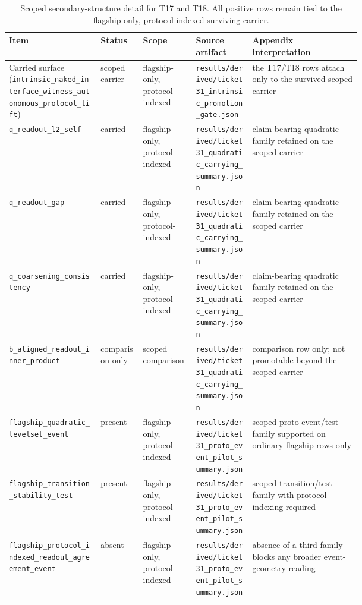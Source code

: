 \documentclass[11pt]{article}
\theoremstyle{definition}
\begin{document}
\begin{table}[p]
\centering
\scriptsize
\caption{Scoped secondary-structure detail for T17 and T18. All positive rows remain tied to
the flagship-only, protocol-indexed surviving carrier.}
\label{tab:appendix-secondary-structure-detail}
\begin{tabularx}{\linewidth}{@{}>{\raggedright\arraybackslash}p{0.26\linewidth}>{\raggedright\arraybackslash}p{0.12\linewidth}>{\raggedright\arraybackslash}p{0.15\linewidth}>{\raggedright\arraybackslash}p{0.16\linewidth}>{\raggedright\arraybackslash}X@{}}
\toprule
Item & Status & Scope & Source artifact & Appendix interpretation \\
\midrule
Carried surface (\nolinkurl{intrinsic_naked_interface_witness_autonomous_protocol_lift}) & scoped carrier & flagship-only, protocol-indexed & \nolinkurl{results/derived/ticket31_intrinsic_promotion_gate.json} & the T17/T18 rows attach only to the survived scoped carrier \\
\nolinkurl{q_readout_l2_self} & carried & flagship-only, protocol-indexed & \nolinkurl{results/derived/ticket31_quadratic_carrying_summary.json} & claim-bearing quadratic family retained on the scoped carrier \\
\nolinkurl{q_readout_gap} & carried & flagship-only, protocol-indexed & \nolinkurl{results/derived/ticket31_quadratic_carrying_summary.json} & claim-bearing quadratic family retained on the scoped carrier \\
\nolinkurl{q_coarsening_consistency} & carried & flagship-only, protocol-indexed & \nolinkurl{results/derived/ticket31_quadratic_carrying_summary.json} & claim-bearing quadratic family retained on the scoped carrier \\
\nolinkurl{b_aligned_readout_inner_product} & comparison only & scoped comparison & \nolinkurl{results/derived/ticket31_quadratic_carrying_summary.json} & comparison row only; not promotable beyond the scoped carrier \\
\nolinkurl{flagship_quadratic_levelset_event} & present & flagship-only, protocol-indexed & \nolinkurl{results/derived/ticket31_proto_event_pilot_summary.json} & scoped proto-event/test family supported on ordinary flagship rows only \\
\nolinkurl{flagship_transition_stability_test} & present & flagship-only, protocol-indexed & \nolinkurl{results/derived/ticket31_proto_event_pilot_summary.json} & scoped transition/test family with protocol indexing required \\
\nolinkurl{flagship_protocol_indexed_readout_agreement_event} & absent & flagship-only, protocol-indexed & \nolinkurl{results/derived/ticket31_proto_event_pilot_summary.json} & absence of a third family blocks any broader event-geometry reading \\
\bottomrule
\end{tabularx}
\end{table}
 
\clearpage


\end{document}
